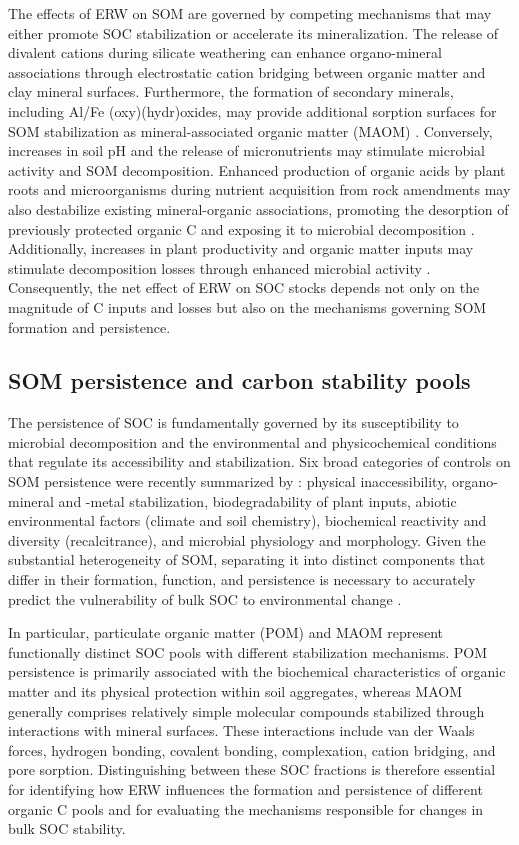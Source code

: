 \documentclass[preprint,12pt]{elsarticle}
\begin{document}
The effects of ERW on SOM are governed by competing mechanisms that may either promote SOC stabilization or accelerate its mineralization. The release of divalent cations during silicate weathering can enhance organo-mineral associations through electrostatic cation bridging between organic matter and clay mineral surfaces. Furthermore, the formation of secondary minerals, including Al/Fe (oxy)(hydr)oxides, may provide additional sorption surfaces for SOM stabilization as mineral-associated organic matter (MAOM) \citep{Vienne2025}. Conversely, increases in soil pH and the release of micronutrients may stimulate microbial activity and SOM decomposition. Enhanced production of organic acids by plant roots and microorganisms during nutrient acquisition from rock amendments may also destabilize existing mineral-organic associations, promoting the desorption of previously protected organic C and exposing it to microbial decomposition \citep{Niron2024,sokol2024reduced}. Additionally, increases in plant productivity and organic matter inputs may stimulate decomposition losses through enhanced microbial activity \citep{stoner2021turnover}. Consequently, the net effect of ERW on SOC stocks depends not only on the magnitude of C inputs and losses but also on the mechanisms governing SOM formation and persistence.

\subsection{SOM persistence and carbon stability pools}

The persistence of SOC is fundamentally governed by its susceptibility to microbial decomposition and the environmental and physicochemical conditions that regulate its accessibility and stabilization. Six broad categories of controls on SOM persistence were recently summarized by \citep{rocci2024bridging}: physical inaccessibility, organo-mineral and -metal stabilization, biodegradability of plant inputs, abiotic environmental factors (climate and soil chemistry), biochemical reactivity and diversity (recalcitrance), and microbial physiology and morphology. Given the substantial heterogeneity of SOM, separating it into distinct components that differ in their formation, function, and persistence is necessary to accurately predict the vulnerability of bulk SOC to environmental change \citep{lavallee2019conceptualizing}.

In particular, particulate organic matter (POM) and MAOM represent functionally distinct SOC pools with different stabilization mechanisms. POM persistence is primarily associated with the biochemical characteristics of organic matter and its physical protection within soil aggregates, whereas MAOM generally comprises relatively simple molecular compounds stabilized through interactions with mineral surfaces. These interactions include van der Waals forces, hydrogen bonding, covalent bonding, complexation, cation bridging, and pore sorption. Distinguishing between these SOC fractions is therefore essential for identifying how ERW influences the formation and persistence of different organic C pools and for evaluating the mechanisms responsible for changes in bulk SOC stability.
\end{document}
